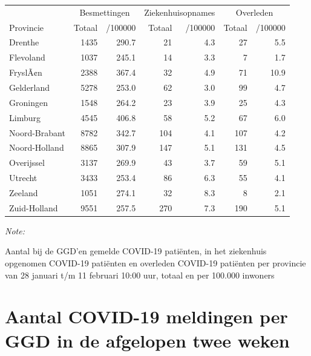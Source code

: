 \documentclass[
  english,
  man,floatsintext]{apa6}
\begin{document}
\begin{table}[H]
\centering
\begin{threeparttable}
\begin{tabular}{lrrrrrr}
\toprule
\multicolumn{1}{c}{ } & \multicolumn{2}{c}{Besmettingen} & \multicolumn{2}{c}{Ziekenhuisopnames} & \multicolumn{2}{c}{Overleden} \\
\cmidrule(l{3pt}r{3pt}){2-3} \cmidrule(l{3pt}r{3pt}){4-5} \cmidrule(l{3pt}r{3pt}){6-7}
Provincie & Totaal & /100000 & Totaal & /100000 & Totaal & /100000\\
\midrule
Drenthe & 1435 & 290.7 & 21 & 4.3 & 27 & 5.5\\
Flevoland & 1037 & 245.1 & 14 & 3.3 & 7 & 1.7\\
FryslÃ¢n & 2388 & 367.4 & 32 & 4.9 & 71 & 10.9\\
Gelderland & 5278 & 253.0 & 62 & 3.0 & 99 & 4.7\\
Groningen & 1548 & 264.2 & 23 & 3.9 & 25 & 4.3\\
Limburg & 4545 & 406.8 & 58 & 5.2 & 67 & 6.0\\
Noord-Brabant & 8782 & 342.7 & 104 & 4.1 & 107 & 4.2\\
Noord-Holland & 8865 & 307.9 & 147 & 5.1 & 131 & 4.5\\
Overijssel & 3137 & 269.9 & 43 & 3.7 & 59 & 5.1\\
Utrecht & 3433 & 253.4 & 86 & 6.3 & 55 & 4.1\\
Zeeland & 1051 & 274.1 & 32 & 8.3 & 8 & 2.1\\
Zuid-Holland & 9551 & 257.5 & 270 & 7.3 & 190 & 5.1\\
\bottomrule
\end{tabular}
\begin{tablenotes}
\item \textit{Note: } 
\item Aantal bij de GGD’en gemelde COVID-19 patiënten, in het ziekenhuis opgenomen COVID-19 patiënten en overleden COVID-19 patiënten per provincie van 28 januari t/m 11 februari 10:00 uur, totaal en per 100.000 inwoners
\end{tablenotes}
\end{threeparttable}
\end{table}

\newpage

\hypertarget{aantal-covid-19-meldingen-per-ggd-in-de-afgelopen-twee-weken}{%
\section{Aantal COVID-19 meldingen per GGD in de afgelopen twee weken}\label{aantal-covid-19-meldingen-per-ggd-in-de-afgelopen-twee-weken}}
\end{document}
